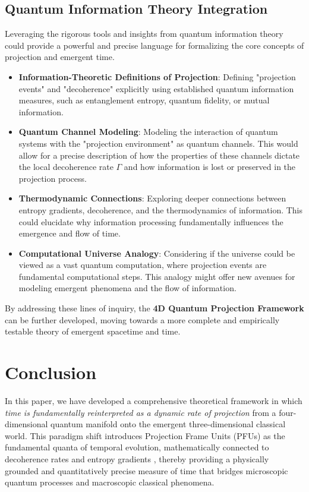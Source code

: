 \documentclass[12pt,a4paper]{article}
\numberwithin{equation}{section}
\begin{document}
\subsection{Quantum Information Theory Integration}
Leveraging the rigorous tools and insights from quantum information theory could provide a powerful and precise language for formalizing the core concepts of projection and emergent time.
\begin{itemize}
    \item \textbf{Information-Theoretic Definitions of Projection}: Defining "projection events" and "decoherence" explicitly using established quantum information measures, such as entanglement entropy, quantum fidelity, or mutual information.
    \item \textbf{Quantum Channel Modeling}: Modeling the interaction of quantum systems with the "projection environment" as quantum channels. This would allow for a precise description of how the properties of these channels dictate the local decoherence rate $\Gamma$ and how information is lost or preserved in the projection process.
    \item \textbf{Thermodynamic Connections}: Exploring deeper connections between entropy gradients, decoherence, and the thermodynamics of information. This could elucidate why information processing fundamentally influences the emergence and flow of time.
    \item \textbf{Computational Universe Analogy}: Considering if the universe could be viewed as a vast quantum computation, where projection events are fundamental computational steps. This analogy might offer new avenues for modeling emergent phenomena and the flow of information.
\end{itemize}

By addressing these lines of inquiry, the \textbf{4D Quantum Projection Framework} can be further developed, moving towards a more complete and empirically testable theory of emergent spacetime and time.

\section{Conclusion}
\label{sec:conclusion}

In this paper, we have developed a comprehensive theoretical framework in which \emph{time is fundamentally reinterpreted as a dynamic rate of projection} from a four-dimensional quantum manifold onto the emergent three-dimensional classical world. This paradigm shift introduces Projection Frame Units (PFUs) as the fundamental quanta of temporal evolution, mathematically connected to decoherence rates and entropy gradients \cite{zurek_decoherence_2003,vedral_quantum_2010}, thereby providing a physically grounded and quantitatively precise measure of time that bridges microscopic quantum processes and macroscopic classical phenomena.
\end{document}
